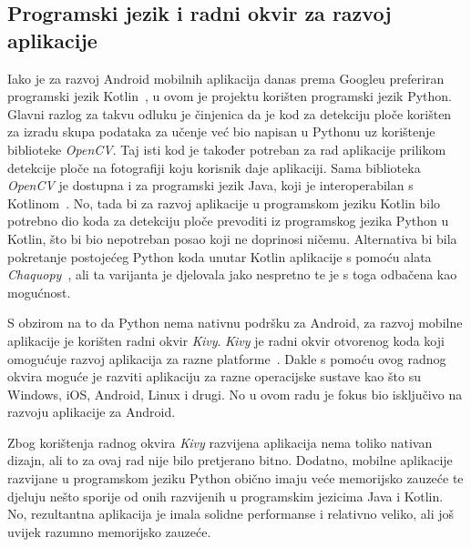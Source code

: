 \documentclass[diplomskirad]{fer}
\begin{document}
		\subsection{Programski jezik i radni okvir za razvoj aplikacije}
			Iako je za razvoj Android mobilnih aplikacija danas prema Googleu preferiran programski jezik Kotlin~\cite{IBMChoosingLanguage}, u ovom je projektu korišten programski jezik Python. Glavni razlog za takvu odluku je činjenica da je kod za detekciju ploče korišten za izradu skupa podataka za učenje već bio napisan u Pythonu uz korištenje  biblioteke \textit{OpenCV}. Taj isti kod je također potreban za rad aplikacije prilikom detekcije ploče na fotografiji koju korisnik daje aplikaciji. Sama biblioteka \textit{OpenCV} je dostupna i za programski jezik Java, koji je interoperabilan s Kotlinom~\cite{IBMChoosingLanguage}. No, tada bi za razvoj aplikacije u programskom jeziku Kotlin bilo potrebno dio koda za detekciju ploče prevoditi iz programskog jezika Python u Kotlin, što bi bio nepotreban posao koji ne doprinosi ničemu. Alternativa bi bila pokretanje postojećeg Python koda unutar Kotlin aplikacije s pomoću alata \textit{Chaquopy}~\cite{PowerGatePythonAndroidDiscussion}, ali ta varijanta je djelovala jako nespretno te je s toga odbačena kao mogućnost.
			
			S obzirom na to da Python nema nativnu podršku za Android, za razvoj mobilne aplikacije je korišten radni okvir \textit{Kivy}. \textit{Kivy} je radni okvir otvorenog koda koji omogućuje razvoj aplikacija za razne platforme~\cite{PowerGatePythonAndroidDiscussion}. Dakle s pomoću ovog radnog okvira moguće je razviti aplikaciju za razne operacijske sustave kao što su Windows, iOS, Android, Linux i drugi. No u ovom radu je fokus bio isključivo na razvoju aplikacije za Android. 
			
			Zbog korištenja radnog okvira \textit{Kivy} razvijena aplikacija nema toliko nativan dizajn, ali to za ovaj rad nije bilo pretjerano bitno. Dodatno, mobilne aplikacije razvijane u programskom jeziku Python obično imaju veće memorijsko zauzeće te djeluju nešto sporije od onih razvijenih u programskim jezicima Java i Kotlin. No, rezultantna aplikacija je imala solidne performanse i relativno veliko, ali još uvijek razumno memorijsko zauzeće.
		
\end{document}
